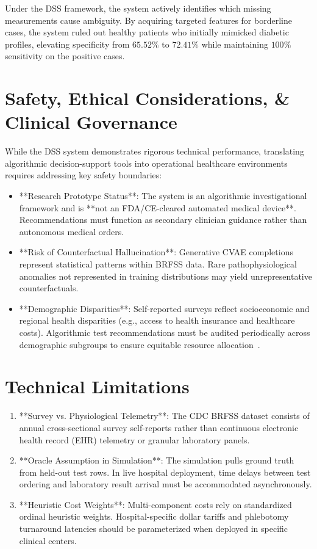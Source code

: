 \documentclass[11pt,a4paper]{report}
\begin{document}
Under the DSS framework, the system actively identifies which missing measurements cause ambiguity. By acquiring targeted features for borderline cases, the system ruled out healthy patients who initially mimicked diabetic profiles, elevating specificity from $65.52\%$ to $72.41\%$ while maintaining $100\%$ sensitivity on the positive cases.

\section{Safety, Ethical Considerations, \& Clinical Governance}
While the DSS system demonstrates rigorous technical performance, translating algorithmic decision-support tools into operational healthcare environments requires addressing key safety boundaries:
\begin{itemize}[leftmargin=*]
  \item **Research Prototype Status**: The system is an algorithmic investigational framework and is **not an FDA/CE-cleared automated medical device**. Recommendations must function as secondary clinician guidance rather than autonomous medical orders.
  \item **Risk of Counterfactual Hallucination**: Generative CVAE completions represent statistical patterns within BRFSS data. Rare pathophysiological anomalies not represented in training distributions may yield unrepresentative counterfactuals.
  \item **Demographic Disparities**: Self-reported surveys reflect socioeconomic and regional health disparities (e.g., access to health insurance and healthcare costs). Algorithmic test recommendations must be audited periodically across demographic subgroups to ensure equitable resource allocation~\cite{topol2019high,rajkomar2018scalable}.
\end{itemize}

\section{Technical Limitations}
\begin{enumerate}[noitemsep]
  \item **Survey vs. Physiological Telemetry**: The CDC BRFSS dataset consists of annual cross-sectional survey self-reports rather than continuous electronic health record (EHR) telemetry or granular laboratory panels.
  \item **Oracle Assumption in Simulation**: The simulation pulls ground truth from held-out test rows. In live hospital deployment, time delays between test ordering and laboratory result arrival must be accommodated asynchronously.
  \item **Heuristic Cost Weights**: Multi-component costs rely on standardized ordinal heuristic weights. Hospital-specific dollar tariffs and phlebotomy turnaround latencies should be parameterized when deployed in specific clinical centers.
\end{enumerate}
\end{document}
